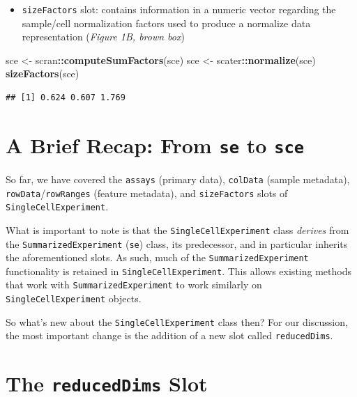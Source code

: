 \documentclass[]{book}
\newenvironment{Shaded}{\begin{snugshade}}{\end{snugshade}}
\newcommand{\KeywordTok}[1]{\textcolor[rgb]{0.13,0.29,0.53}{\textbf{#1}}}
\newcommand{\NormalTok}[1]{#1}
\newcommand{\OperatorTok}[1]{\textcolor[rgb]{0.81,0.36,0.00}{\textbf{#1}}}
\newcommand{\StringTok}[1]{\textcolor[rgb]{0.31,0.60,0.02}{#1}}
\providecommand{\tightlist}{%
  \setlength{\itemsep}{0pt}\setlength{\parskip}{0pt}}
\begin{document}
\begin{itemize}
\tightlist
\item
  \texttt{sizeFactors} slot: contains information in a numeric vector regarding the sample/cell normalization factors used to produce a normalize data representation (\emph{Figure 1B, brown box})
\end{itemize}

\begin{Shaded}
\begin{Highlighting}[]
\NormalTok{sce <-}\StringTok{ }\NormalTok{scran}\OperatorTok{::}\KeywordTok{computeSumFactors}\NormalTok{(sce)}
\NormalTok{sce <-}\StringTok{ }\NormalTok{scater}\OperatorTok{::}\KeywordTok{normalize}\NormalTok{(sce)}
\KeywordTok{sizeFactors}\NormalTok{(sce)}
\end{Highlighting}
\end{Shaded}

\begin{verbatim}
## [1] 0.624 0.607 1.769
\end{verbatim}

\hypertarget{a-brief-recap-from-se-to-sce}{%
\section{\texorpdfstring{A Brief Recap: From \texttt{se} to \texttt{sce}}{A Brief Recap: From se to sce}}\label{a-brief-recap-from-se-to-sce}}

So far, we have covered the \texttt{assays} (primary data), \texttt{colData} (sample metadata), \texttt{rowData}/\texttt{rowRanges} (feature metadata), and \texttt{sizeFactors} slots of \texttt{SingleCellExperiment}.

What is important to note is that the \texttt{SingleCellExperiment} class \emph{derives} from the \texttt{SummarizedExperiment} (\texttt{se}) class, its predecessor, and in particular inherits the aforementioned slots. As such, much of the \texttt{SummarizedExperiment} functionality is retained in \texttt{SingleCellExperiment}. This allows existing methods that work with \texttt{SummarizedExperiment} to work similarly on \texttt{SingleCellExperiment} objects.

So what's new about the \texttt{SingleCellExperiment} class then? For our discussion, the most important change is the addition of a new slot called \texttt{reducedDims}.

\hypertarget{the-reduceddims-slot}{%
\section{\texorpdfstring{The \texttt{reducedDims} Slot}{The reducedDims Slot}}\label{the-reduceddims-slot}}
\end{document}
